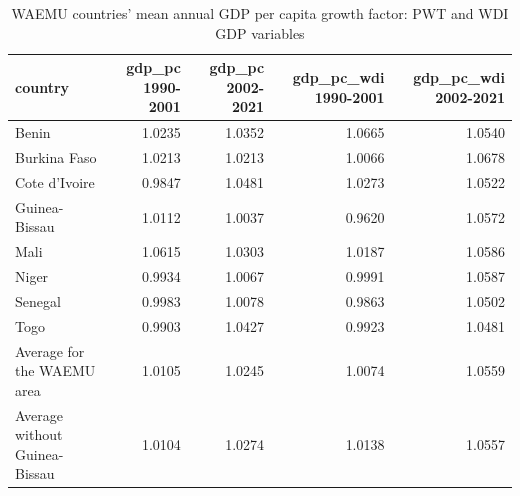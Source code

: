 \begin{table}

\caption{WAEMU countries' mean annual GDP per capita growth factor: PWT and WDI GDP variables}
\centering
\begin{tabular}[t]{lrrrr}
\toprule
country & gdp\_pc 1990-2001 & gdp\_pc 2002-2021 & gdp\_pc\_wdi 1990-2001 & gdp\_pc\_wdi 2002-2021\\
\midrule
Benin & 1.0235 & 1.0352 & 1.0665 & 1.0540\\
Burkina Faso & 1.0213 & 1.0213 & 1.0066 & 1.0678\\
Cote d'Ivoire & 0.9847 & 1.0481 & 1.0273 & 1.0522\\
Guinea-Bissau & 1.0112 & 1.0037 & 0.9620 & 1.0572\\
Mali & 1.0615 & 1.0303 & 1.0187 & 1.0586\\
\addlinespace
Niger & 0.9934 & 1.0067 & 0.9991 & 1.0587\\
Senegal & 0.9983 & 1.0078 & 0.9863 & 1.0502\\
Togo & 0.9903 & 1.0427 & 0.9923 & 1.0481\\
Average for the WAEMU area & 1.0105 & 1.0245 & 1.0074 & 1.0559\\
Average without Guinea-Bissau & 1.0104 & 1.0274 & 1.0138 & 1.0557\\
\bottomrule
\end{tabular}
\end{table}